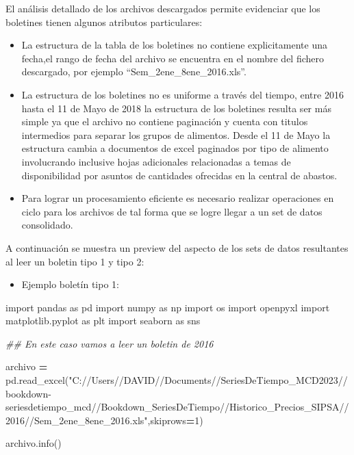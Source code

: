 \documentclass[
]{book}
\newenvironment{Shaded}{\begin{snugshade}}{\end{snugshade}}
\newcommand{\CommentTok}[1]{\textcolor[rgb]{0.56,0.35,0.01}{\textit{#1}}}
\newcommand{\DecValTok}[1]{\textcolor[rgb]{0.00,0.00,0.81}{#1}}
\newcommand{\ImportTok}[1]{#1}
\newcommand{\NormalTok}[1]{#1}
\newcommand{\OperatorTok}[1]{\textcolor[rgb]{0.81,0.36,0.00}{\textbf{#1}}}
\newcommand{\StringTok}[1]{\textcolor[rgb]{0.31,0.60,0.02}{#1}}
\providecommand{\tightlist}{%
  \setlength{\itemsep}{0pt}\setlength{\parskip}{0pt}}
\begin{document}
El análisis detallado de los archivos descargados permite evidenciar que los boletines tienen algunos atributos particulares:

\begin{itemize}
\item
  La estructura de la tabla de los boletines no contiene explicitamente una fecha,el rango de fecha del archivo se encuentra en el nombre del fichero descargado, por ejemplo ``Sem\_2ene\_8ene\_2016.xls''.
\item
  La estructura de los boletines no es uniforme a través del tiempo, entre 2016 hasta el 11 de Mayo de 2018 la estructura de los boletines resulta ser más simple ya que el archivo no contiene paginación y cuenta con titulos intermedios para separar los grupos de alimentos. Desde el 11 de Mayo la estructura cambia a documentos de excel paginados por tipo de alimento involucrando inclusive hojas adicionales relacionadas a temas de disponibilidad por asuntos de cantidades ofrecidas en la central de abastos.
\item
  Para lograr un procesamiento eficiente es necesario realizar operaciones en ciclo para los archivos de tal forma que se logre llegar a un set de datos consolidado.
\end{itemize}

A continuación se muestra un preview del aspecto de los sets de datos resultantes al leer un boletin tipo 1 y tipo 2:

\begin{itemize}
\tightlist
\item
  Ejemplo boletín tipo 1:
\end{itemize}

\begin{Shaded}
\begin{Highlighting}[]

\ImportTok{import}\NormalTok{ pandas }\ImportTok{as}\NormalTok{ pd}
\ImportTok{import}\NormalTok{ numpy }\ImportTok{as}\NormalTok{ np }
\ImportTok{import}\NormalTok{ os }
\ImportTok{import}\NormalTok{ openpyxl}
\ImportTok{import}\NormalTok{ matplotlib.pyplot }\ImportTok{as}\NormalTok{ plt }
\ImportTok{import}\NormalTok{ seaborn }\ImportTok{as}\NormalTok{ sns}

\CommentTok{\#\# En este caso vamos a leer un boletin de 2016}

\NormalTok{archivo }\OperatorTok{=}\NormalTok{ pd.read\_excel(}\StringTok{"C://Users//DAVID//Documents//SeriesDeTiempo\_MCD2023//bookdown{-}seriesdetiempo\_mcd//Bookdown\_SeriesDeTiempo//Historico\_Precios\_SIPSA//2016//Sem\_2ene\_8ene\_2016.xls"}\NormalTok{,skiprows}\OperatorTok{=}\DecValTok{1}\NormalTok{)}

\NormalTok{archivo.info()}
\end{Highlighting}
\end{Shaded}
\end{document}
